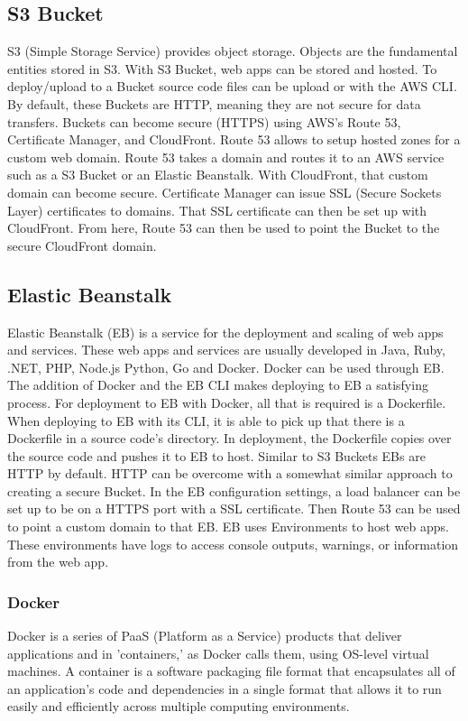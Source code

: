 \subsection{S3 Bucket}
S3 (Simple Storage Service) provides object storage. Objects are the fundamental entities stored in S3. With S3 Bucket, web apps can be stored and hosted. To deploy/upload to a Bucket source code files can be upload or with the AWS CLI. \cite{ref22} By default, these Buckets are HTTP, meaning they are not secure for data transfers. Buckets can become secure (HTTPS) using AWS's Route 53, Certificate Manager, and CloudFront. Route 53 allows to setup hosted zones for a custom web domain. Route 53 takes a domain and routes it to an AWS service such as a S3 Bucket or an Elastic Beanstalk. With CloudFront, that custom domain can become secure. Certificate Manager can issue SSL (Secure Sockets Layer) certificates to domains. That SSL certificate can then be set up with CloudFront. From here, Route 53 can then be used to point the Bucket to the secure CloudFront domain.

\subsection{Elastic Beanstalk}
Elastic Beanstalk (EB) is a service for the deployment and scaling of web apps and services. These web apps and services are usually developed in Java, Ruby, .NET, PHP, Node.js Python, Go and Docker. \cite{ref23} Docker can be used through EB. The addition of Docker and the EB CLI makes deploying to EB a satisfying process. For deployment to EB with Docker, all that is required is a Dockerfile. When deploying to EB with its CLI, it is able to pick up that there is a Dockerfile in a source code's directory. In deployment, the Dockerfile copies over the source code and pushes it to EB to host. Similar to S3 Buckets EBs are HTTP by default. HTTP can be overcome with a somewhat similar approach to creating a secure Bucket. In the EB configuration settings, a load balancer can be set up to be on a HTTPS port with a SSL certificate. Then Route 53 can be used to point a custom domain to that EB. EB uses Environments to host web apps. These environments have logs to access console outputs, warnings, or information from the web app.

\subsubsection{Docker}
Docker is a series of PaaS (Platform as a Service) products that deliver applications and in 'containers,' as Docker calls them, using OS-level virtual machines. A container is a software packaging file format that encapsulates all of an application's code and dependencies in a single format that allows it to run easily and efficiently across multiple computing environments. \cite{ref24}

